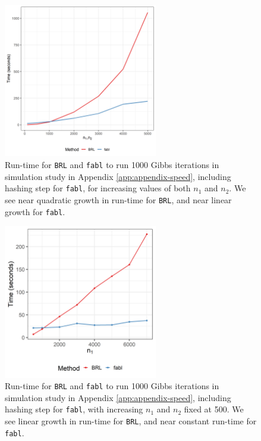 \documentclass[ba]{imsart}
\begin{document}
	\begin{figure}[h!]
		\begin{center} \includegraphics[width=0.6\textwidth]{../notes/figures/sadinle_speed_plot_slides2} 
			\caption{Run-time for \texttt{BRL} and \texttt{fabl} to run 1000 Gibbs iterations in simulation study in Appendix \ref{app:appendix-speed}, including hashing step for \texttt{fabl}, for increasing values of both $n_1$ and $n_2$. We see near quadratic growth in run-time for \texttt{BRL}, and near linear growth for \texttt{fabl}.}\label{fig:app-speed1}
		\end{center}
	\end{figure}
	
	\begin{figure}[h!]
		\begin{center} \includegraphics[width=0.6\textwidth]{../notes/figures/speed_plot_fixed_nB_slides2} 
			\caption{Run-time for \texttt{BRL} and \texttt{fabl} to run 1000 Gibbs iterations in simulation study in Appendix \ref{app:appendix-speed}, including hashing step for \texttt{fabl}, with increasing $n_1$ and $n_2$ fixed at 500. We see linear growth in run-time for \texttt{BRL}, and near constant run-time for \texttt{fabl}.}\label{fig:app-speed2}
		\end{center}
	\end{figure}
\end{document}
